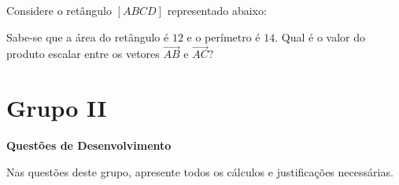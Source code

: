 \documentclass[12pt,a4paper]{exam}
\begin{document}
\begin{questions}
\question
Considere o retângulo \([ABCD]\) representado abaixo:

\begin{center}
\end{center}

Sabe-se que a área do retângulo é \( 12 \) e o perímetro é \( 14 \). Qual é o valor do produto escalar entre os vetores \(\vec{AB}\) e \(\vec{AC}\)?

\begin{choices}
\end{choices}

\end{questions}

\section*{Grupo II}
\textbf{Questões de Desenvolvimento}

Nas questões deste grupo, apresente todos os cálculos e justificações necessárias.
\end{document}
